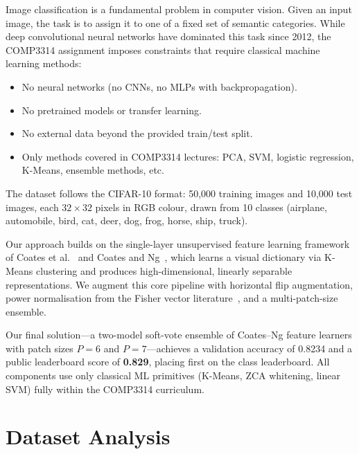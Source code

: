 \documentclass[11pt,a4paper]{article}
\begin{document}
Image classification is a fundamental problem in computer vision.  Given an
input image, the task is to assign it to one of a fixed set of semantic
categories.  While deep convolutional neural networks have dominated this task
since 2012, the COMP3314 assignment imposes constraints that require classical
machine learning methods:

\begin{itemize}[nosep]
  \item No neural networks (no CNNs, no MLPs with backpropagation).
  \item No pretrained models or transfer learning.
  \item No external data beyond the provided train/test split.
  \item Only methods covered in COMP3314 lectures: PCA, SVM, logistic
        regression, K-Means, ensemble methods, etc.
\end{itemize}

The dataset follows the CIFAR-10 format: 50,000 training images and 10,000 test
images, each $32 \times 32$ pixels in RGB colour, drawn from 10 classes
(airplane, automobile, bird, cat, deer, dog, frog, horse, ship, truck).

Our approach builds on the single-layer unsupervised feature learning framework
of Coates et al.~\cite{coates2011analysis} and Coates and Ng~\cite{coates2011selecting},
which learns a visual dictionary via K-Means clustering and produces
high-dimensional, linearly separable representations.  We augment this core
pipeline with horizontal flip augmentation, power normalisation from the Fisher
vector literature~\cite{perronnin2010improving}, and a multi-patch-size
ensemble.

Our final solution---a two-model soft-vote ensemble of Coates--Ng feature
learners with patch sizes $P\!=\!6$ and $P\!=\!7$---achieves a validation
accuracy of 0.8234 and a public leaderboard score of \textbf{0.829}, placing
first on the class leaderboard.  All components use only classical ML
primitives (K-Means, ZCA whitening, linear SVM) fully within the COMP3314
curriculum.

\section{Dataset Analysis}
\label{sec:dataset}
\end{document}
